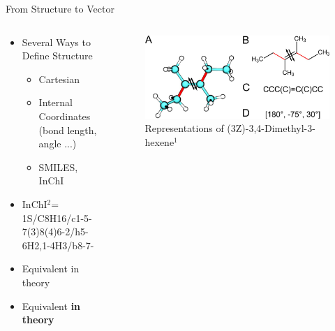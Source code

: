 \documentclass[10pt]{beamer}
\begin{document}
{%
\begin{frame}{From Structure to Vector}
	\begin{columns}[c] %
		\begin{column}{.48\textwidth}
			\begin{itemize}
				\item<1-> {Several Ways to Define Structure
					\begin{itemize}
						\item[] {Cartesian}
						\item[] {Internal Coordinates (bond length, angle ...)}
						\item[] {SMILES, InChI}
					\end{itemize}
				}
				\item<2-> {InChI$^2$= 1S/C8H16/c1-5-7(3)8(4)6-2/h5-6H2,1-4H3/b8-7-}
				\item<only@3> {Equivalent in theory}
				\item<only@4> {Equivalent \alert{\textbf{in theory}}}
			\end{itemize}			
		\end{column}
		\hfill
		\begin{column}{0.48\textwidth}
			\begin{figure}
				\includegraphics[width=0.95\linewidth]{images/Supady1.jpeg}
				\caption*{Representations of (3Z)-3,4-Dimethyl-3-hexene$^1$}
			\end{figure}
		\end{column}	
	\end{columns}
\end{frame}
}
\end{document}
